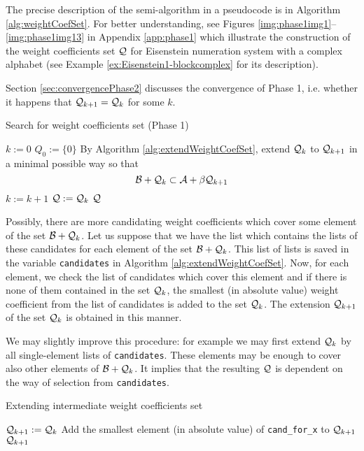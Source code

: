 The precise description of the semi-algorithm in a pseudocode is in Algorithm \ref{alg:weightCoefSet}. For better understanding, see Figures \ref{img:phase1img1}--\ref{img:phase1img13} in Appendix \ref{app:phase1} which illustrate the construction of the weight coefficients set $\mathcal{Q}$ for Eisenstein numeration system with a complex alphabet (see Example \ref{ex:Eisenstein1-blockcomplex} for its description). 

Section \ref{sec:convergencePhase2} discusses the convergence of Phase 1, i.e. whether it happens that  $\mathcal{Q}_{k+1}=\mathcal{Q}_k$ for some  $k$.
    
\begin{algorithm}
  \caption{Search for weight coefficients set (Phase 1)}
    \label{alg:weightCoefSet}
  \begin{algorithmic}[1]
    \STATE $k:=0$ 
    \STATE $Q_0:=\{0\}$
    \REPEAT
     \STATE  By Algorithm \ref{alg:extendWeightCoefSet}, extend $\mathcal{Q}_k$ to $\mathcal{Q}_{k+1}$ in a minimal possible way so that $$\mathcal{B}+ \mathcal{Q}_k \subset \mathcal{A} + \beta \mathcal{Q}_{k+1}$$
     \vspace{-20pt}
      \STATE  $k:=k+1$
      \STATE $\mathcal{Q}:=\mathcal{Q}_k$
    \RETURN $\mathcal{Q}$
  \end{algorithmic}
\end{algorithm}

Possibly, there are more candidating weight coefficients which cover some element of the set $\mathcal{B}+ \mathcal{Q}_k$. Let us suppose that we have the list which contains the lists of these candidates for each element of the set $\mathcal{B}+ \mathcal{Q}_k$. This list of lists is saved in the variable \verb+candidates+ in Algorithm \ref{alg:extendWeightCoefSet}. Now, for each element, we check the list of candidates which cover this element and if there is none of them contained in the set $\mathcal{Q}_k$, the smallest (in absolute value) weight coefficient from the list of candidates is added to the set $\mathcal{Q}_k$. The extension $\mathcal{Q}_{k+1}$ of the set $\mathcal{Q}_k$ is obtained in this manner.   

We may slightly improve this procedure: for example we may first extend $\mathcal{Q}_{k}$ by all single-element lists of \verb+candidates+. These elements may be enough to cover also other elements of $\mathcal{B}+\mathcal{Q}_{k}$. It implies that the resulting $\mathcal{Q}$ is dependent on the way of selection from \verb+candidates+.

\begin{algorithm}
  \caption{Extending intermediate weight coefficients set}
    \label{alg:extendWeightCoefSet}
  \begin{algorithmic}[1]
    \STATE $\mathcal{Q}_{k+1}:=\mathcal{Q}_{k}$
            \STATE Add the smallest element (in absolute value) of  \verb+cand_for_x+ to $\mathcal{Q}_{k+1}$  
        \ENDIF
    \ENDFOR
    \RETURN $\mathcal{Q}_{k+1}$
  \end{algorithmic}
\end{algorithm}


